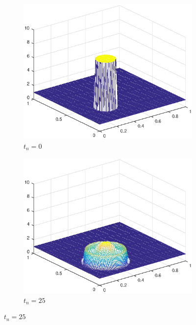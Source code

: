 \begin{figure}[h!]
    \centering
    \begin{subfigure}[t]{0.4\textwidth}
        \centering
        \includegraphics[width=\textwidth]{images/sol_ri_0000_per.eps}
        \caption{$t_{n}=0$}
        \label{fig:0}
    \end{subfigure}
    \begin{subfigure}[t]{0.48\textwidth}
        \centering
        \includegraphics[width=\textwidth]{images/sol_ri_0025_per.eps}
        \caption{$t_{n}=25$}
        \label{fig:10}
    \end{subfigure}

\end{figure}
